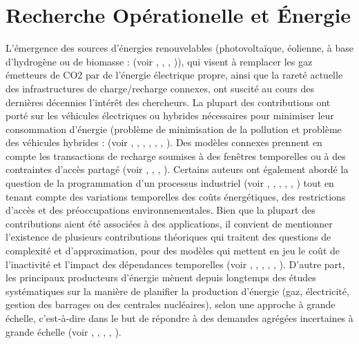 \section{Recherche Opérationelle et Énergie	}
 L'émergence des sources d'énergies renouvelables (photovoltaïque, éolienne, à base d'hydrogène ou de biomasse : (voir \cite{article_hydro_elect_hybrid2}, \cite{article_hydro_elect_hybrid1}, \cite{Grimes}, \cite{Licht2008})), qui visent à remplacer les gaz émetteurs de CO2 par de l'énergie électrique propre, ainsi que la rareté actuelle des infrastructures de charge/recharge connexes, ont suscité au cours des dernières décennies l'intérêt des chercheurs. La plupart des contributions ont porté sur les véhicules électriques ou hybrides nécessaires pour minimiser leur consommation d'énergie (problème de minimisation de la pollution et problème des véhicules hybrides : (voir \cite{article_GVRP3}, 	\cite{article_GVRP8}, \cite{article_GVRP10}, \cite{article_GVRP2}, \cite{article_GVRP13}, \cite{article_HVRP2}, 	\cite{article_GVRP16}). Des modèles connexes prennent en compte les transactions de recharge soumises à des fenêtres temporelles ou à des contraintes d'accès partagé (voir \cite{article_GVRP9}, \cite{article_GVRP4}, \cite{article_RVRP1}, \cite{article_HVRP4}). Certains auteurs ont également abordé la question de la programmation d'un processus industriel (voir \cite{Energy-Efficient-Albers-Susanne}, \cite{ANGEL20141}, \cite{inproceedings-Baptiste-Modeles}, \cite{quilliot:hal-01366540}, \cite{article-Demaine-Scheduling}, \cite{article_prod3}) tout en tenant compte des variations temporelles des coûts énergétiques, des restrictions d'accès et des préoccupations environnementales. Bien que la plupart des contributions aient été associées à des applications, il convient de mentionner l'existence de plusieurs contributions théoriques qui traitent des questions de complexité et d'approximation, pour des modèles qui mettent en jeu le coût de l'inactivité et l'impact des dépendances temporelles (voir \cite{Energy-Efficient-Albers-Susanne}, \cite{ANGEL20141}, \cite{quilliot:hal-01366540}, \cite{article-Homogeneously-alain}, \cite{article-Demaine-Scheduling}, \cite{article-Irani-Algorithmic}). D'autre part, les principaux producteurs d'énergie mènent depuis longtemps des études systématiques sur la manière de planifier la production d'énergie (gaz, électricité, gestion des barrages ou des centrales nucléaires), selon une approche à grande échelle, c'est-à-dire dans le but de répondre à des demandes agrégées incertaines à grande échelle (voir \cite{845896A-survey-of-design}, \cite{article_prod2}, \cite{article_prod1}, \cite{article_prod4}, \cite{RePEc:eee:ejores:v:261:y:2017:i:1:p:67-74}).

